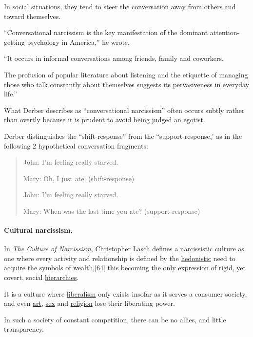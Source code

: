 \documentclass[oneside]{book}
\numberwithin{equation}{section}
\begin{document}
In social situations, they tend to steer the \href{https://en.wikipedia.org/wiki/Conversation}{conversation} away from others and toward themselves.

``Conversational narcissism is the key manifestation of the dominant attention-getting psychology in America,'' he wrote.

``It occurs in informal conversations among friends, family and coworkers.

The profusion of popular literature about listening and the etiquette of managing those who talk constantly about themselves suggests its pervasiveness in everyday life.''

What Derber describes as ``conversational narcissism'' often occurs subtly rather than overtly because it is prudent to avoid being judged an egotist.

Derber distinguishes the ``shift-response'' from the ``support-response,' as in the following 2 hypothetical conversation fragments:
\begin{quotation}
    John: I'm feeling really starved.
    
    Mary: Oh, I just ate. (shift-response)
    
    John: I'm feeling really starved.
    
    Mary: When was the last time you ate? (support-response)
\end{quotation}

\paragraph{Cultural narcissism.} In \href{https://en.wikipedia.org/wiki/The_Culture_of_Narcissism}{\textit{The Culture of Narcissism}}, \href{https://en.wikipedia.org/wiki/Christopher_Lasch}{Christopher Lasch} defines a narcissistic culture as one where every activity and relationship is defined by the \href{https://en.wikipedia.org/wiki/Hedonism}{hedonistic} need to acquire the symbols of wealth,[64] this becoming the only expression of rigid, yet covert, social \href{https://en.wikipedia.org/wiki/Hierarchy}{hierarchies}.

It is a culture where \href{https://en.wikipedia.org/wiki/Liberalism}{liberalism} only exists insofar as it serves a consumer society, and even \href{https://en.wikipedia.org/wiki/Art}{art}, \href{https://en.wikipedia.org/wiki/Sex}{sex} and \href{https://en.wikipedia.org/wiki/Religion}{religion} lose their liberating power.

In such a society of constant competition, there can be no allies, and little transparency.
\end{document}
